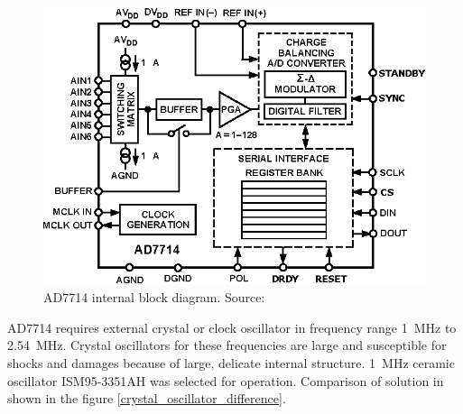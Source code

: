         \begin{figure}[H]
            \centering
            \includegraphics[width=0.5\paperwidth]{img/06/AD7714.eps}
            \caption{AD7714 internal block diagram. Source: \cite{AD7714_datasheet}}
            \label{AD7714}
        \end{figure}

        AD7714 requires external crystal or clock oscillator in frequency range \SI{1}{\mega\hertz} to \SI{2.54}{\mega\hertz}. Crystal oscillators for these frequencies are large and susceptible for shocks and damages because of large, delicate internal structure. \SI{1}{\mega\hertz} ceramic oscillator ISM95-3351AH was selected for operation. Comparison of solution in shown in the figure \ref{crystal_oscillator_difference}.

